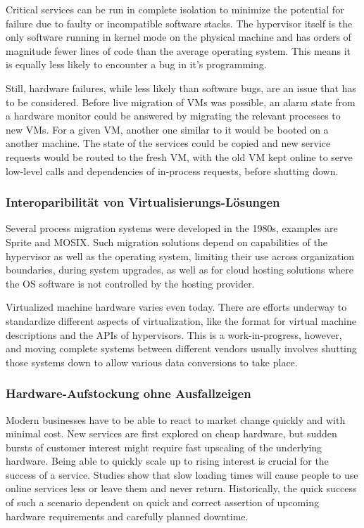 \documentclass[a4paper,conference,compsoc]{IEEEtran}
\begin{document}
Critical services can be run in complete isolation to minimize the
potential for failure due to faulty or incompatible software
stacks. The hypervisor itself is the only software running in kernel
mode on the physical machine and has orders of magnitude fewer lines
of code than the average operating system. This means it is equally
less likely to encounter a bug in it's programming.

Still, hardware failures, while less likely than software bugs, are an
issue that has to be considered. Before live migration of VMs was
possible, an alarm state from a hardware monitor could be answered by
migrating the relevant processes to new VMs\cite{hansen2004self}. For
a given VM, another one similar to it would be booted on a another
machine. The state of the services could be copied and new service
requests would be routed to the fresh VM, with the old VM kept online
to serve low-level calls and dependencies of in-process requests,
before shutting down\cite{clark2005live}.

\subsubsection{Interoparibilität von Virtualisierungs-Lösungen}
Several process migration systems were developed in the 1980s,
examples are Sprite and MOSIX\cite{hansen2004self}. Such migration
solutions depend on capabilities of the hypervisor as well as the
operating system, limiting their use across organization boundaries,
during system upgrades, as well as for cloud hosting solutions where
the OS software is not controlled by the hosting provider.

Virtualized machine hardware varies even today. There are efforts
underway\cite{cloudstandard} to standardize different aspects of
virtualization, like the format for virtual machine descriptions and
the APIs of hypervisors. This is a work-in-progress, however, and
moving complete systems between different vendors usually involves
shutting those systems down to allow various data conversions to take
place.

\subsubsection{Hardware-Aufstockung ohne Ausfallzeigen}
Modern businesses have to be able to react to market change quickly
and with minimal cost. New services are first explored on cheap
hardware\cite{tanenbaum1992modern}, but sudden bursts of customer
interest might require fast upscaling of the underlying
hardware. Being able to quickly scale up to rising interest is crucial
for the success of a service. Studies show that slow loading times
will cause people to use online services less or leave them and never
return\cite{kohavi2007online}. Historically, the quick success of such
a scenario dependent on quick and correct assertion of upcoming
hardware requirements and carefully planned downtime.
\end{document}
